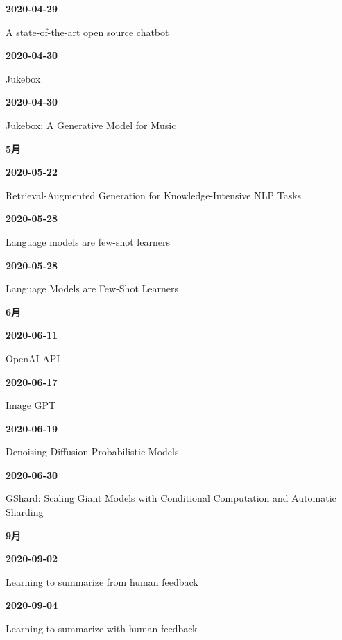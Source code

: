 \noindent\textbf{2020-04-29}\par
{\raggedright A state-of-the-art open source chatbot\,\cite{src-66cb10bf43ff}\par}
\smallskip
\noindent\textbf{2020-04-30}\par
{\raggedright Jukebox\,\cite{chron-3039e4df07aa}\par}
\smallskip
\noindent\textbf{2020-04-30}\par
{\raggedright Jukebox: A Generative Model for Music\,\cite{chron-1333727c8c62}\par}
\smallskip
\medskip
\noindent\textbf{5月}\par
\smallskip
\noindent\textbf{2020-05-22}\par
{\raggedright Retrieval-Augmented Generation for Knowledge-Intensive NLP Tasks\,\cite{src-38c08ba169f1}\par}
\smallskip
\noindent\textbf{2020-05-28}\par
{\raggedright Language models are few-shot learners\,\cite{src-8f27ffb5bc66}\par}
\smallskip
\noindent\textbf{2020-05-28}\par
{\raggedright Language Models are Few-Shot Learners\,\cite{src-0fc45aa25dc7}\par}
\smallskip
\medskip
\noindent\textbf{6月}\par
\smallskip
\noindent\textbf{2020-06-11}\par
{\raggedright OpenAI API\,\cite{src-3b6a4c260e20}\par}
\smallskip
\noindent\textbf{2020-06-17}\par
{\raggedright Image GPT\,\cite{src-d46ff01d5c8d}\par}
\smallskip
\noindent\textbf{2020-06-19}\par
{\raggedright Denoising Diffusion Probabilistic Models\,\cite{src-d6e451e5085e}\par}
\smallskip
\noindent\textbf{2020-06-30}\par
{\raggedright GShard: Scaling Giant Models with Conditional Computation and Automatic Sharding\,\cite{src-56ccf2fa5ce7}\par}
\smallskip
\medskip
\noindent\textbf{9月}\par
\smallskip
\noindent\textbf{2020-09-02}\par
{\raggedright Learning to summarize from human feedback\,\cite{src-8622fc1e22c2}\par}
\smallskip
\noindent\textbf{2020-09-04}\par
{\raggedright Learning to summarize with human feedback\,\cite{src-e5838d162a66}\par}
